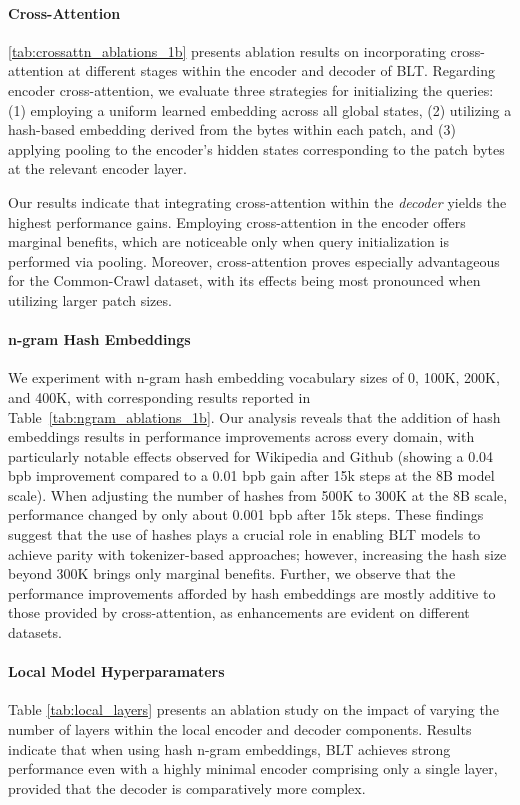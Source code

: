 \paragraph{Cross-Attention} 
\autoref{tab:crossattn_ablations_1b} presents ablation results on incorporating cross-attention at different stages within the encoder and decoder of {\textsc BLT}. Regarding encoder cross-attention, we evaluate three strategies for initializing the queries: (1) employing a uniform learned embedding across all global states, (2) utilizing a hash-based embedding derived from the bytes within each patch, and (3) applying pooling to the encoder's hidden states corresponding to the patch bytes at the relevant encoder layer.

Our results indicate that integrating cross-attention within the \textit{decoder} yields the highest performance gains. Employing cross-attention in the encoder offers marginal benefits, which are noticeable only when query initialization is performed via pooling. Moreover, cross-attention proves especially advantageous for the Common-Crawl dataset, with its effects being most pronounced when utilizing larger patch sizes.

\paragraph{n-gram Hash Embeddings} 

We experiment with n-gram hash embedding vocabulary sizes of 0, 100K, 200K, and 400K, with corresponding results reported in Table~\ref{tab:ngram_ablations_1b}. Our analysis reveals that the addition of hash embeddings results in performance improvements across every domain, with particularly notable effects observed for Wikipedia and Github (showing a 0.04 bpb improvement compared to a 0.01 bpb gain after 15k steps at the 8B model scale). When adjusting the number of hashes from 500K to 300K at the 8B scale, performance changed by only about 0.001 bpb after 15k steps. These findings suggest that the use of hashes plays a crucial role in enabling {\textsc BLT} models to achieve parity with tokenizer-based approaches; however, increasing the hash size beyond 300K brings only marginal benefits. Further, we observe that the performance improvements afforded by hash embeddings are mostly additive to those provided by cross-attention, as enhancements are evident on different datasets.

\paragraph{Local Model Hyperparamaters} Table \ref{tab:local_layers} presents an ablation study on the impact of varying the number of layers within the local encoder and decoder components. Results indicate that when using hash n-gram embeddings, {\textsc BLT} achieves strong performance even with a highly minimal encoder comprising only a single layer, provided that the decoder is comparatively more complex.

